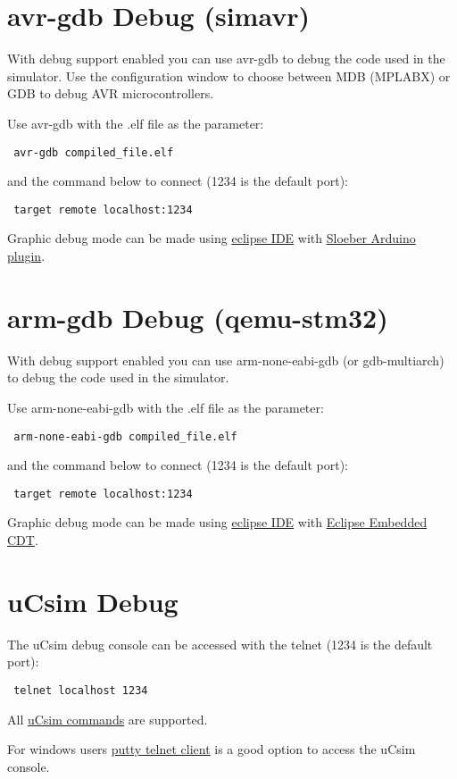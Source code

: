 \section{avr-gdb Debug (simavr) \label{gdbavr}}
 
 With debug support enabled you can use avr-gdb to debug the code used in the simulator. 
 Use the configuration window to choose between MDB (MPLABX) or GDB to debug AVR microcontrollers. 
 
 
 Use avr-gdb with the .elf file as the parameter:
 \begin{verbatim}
 avr-gdb compiled_file.elf
 \end{verbatim}
 and the command below to connect (1234 is the default port):
 \begin{verbatim}
 target remote localhost:1234
 \end{verbatim}

Graphic debug mode can be made using \href{https://www.eclipse.org/}{eclipse IDE} with \href{https://eclipse.baeyens.it/}{Sloeber Arduino plugin}.
 

 \section{arm-gdb Debug (qemu-stm32) \label{gdbarm}}
 
 With debug support enabled you can use arm-none-eabi-gdb (or gdb-multiarch) to debug the code used in the simulator. 
 
 Use arm-none-eabi-gdb with the .elf file as the parameter:
 \begin{verbatim}
 arm-none-eabi-gdb compiled_file.elf
 \end{verbatim}
 and the command below to connect (1234 is the default port):
 \begin{verbatim}
 target remote localhost:1234
 \end{verbatim}

Graphic debug mode can be made using \href{https://www.eclipse.org/}{eclipse IDE} with 
\href{https://projects.eclipse.org/projects/iot.embed-cdt}{Eclipse Embedded CDT}.
 
\section{uCsim Debug  \label{ucsim}}
  
The uCsim debug console can be accessed with the telnet (1234 is the default port):
 \begin{verbatim}
 telnet localhost 1234
 \end{verbatim}
 
All \href{http://mazsola.iit.uni-miskolc.hu/\%7edrdani/embedded/ucsim/cmd.html}{uCsim commands} are supported.  

For windows users \href{https://www.putty.org/}{putty telnet client} is a good option to access the uCsim console. 
 
  
